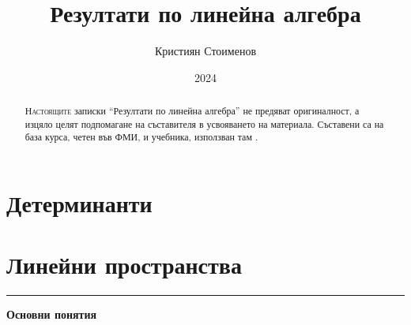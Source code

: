 \documentclass[a4paper]{article}
\title{\textbf{Резултати по линейна алгебра}}
\author{Кристиян Стоименов}
\date{2024}
\renewcommand{\subsection}[1]{\noindent\rule{\textwidth}{.7pt} \hfill \begin{center}\wasyparagraph \hspace{1em}
\textbf{#1} \end{center} }
\begin{document}
\maketitle

\renewcommand{\abstractname}{}
\begin{abstract}
\par \textsc{Настоящите} записки ``Резултати по линейна алгебра'' не предяват оригиналност, а изцяло целят подпомагане на
съставителя в усвояването на материала. Съставени са на база курса, четен във
ФМИ, и учебника, използван там \autocite{fmi-linalg-notes}.
\end{abstract}

\tableofcontents
\bigskip
\printglossary[type=\acronymtype, toctitle=Използвани съкращения,title=Използвани съкращения]
\newpage

\section{Детерминанти}

\section{Линейни пространства}

\subsection{Основни понятия}
\end{document}

